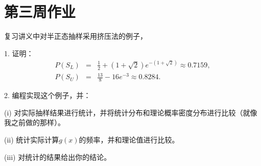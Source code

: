 \documentclass[a4paper]{ctexart}
\begin{document}
\section*{第三周作业}

复习讲义中对半正态抽样采用挤压法的例子，

1. 证明：
  \begin{eqnarray}
    P(S_L) &=& \frac{1}{2} + (1 + \sqrt{2})e^{-(1 + \sqrt{2})} \approx 0.7159,\\
    P(S_U) &=& \frac{13}{8} - 16e^{-3} \approx 0.8284.
  \end{eqnarray}

  2. 编程实现这个例子，并：

  (i) 对实际抽样结果进行统计，并将统计分布和理论概率密度分布进行比较（就像我之前做的那样）。

  (ii) 统计实际计算$g(x)$的频率，并和理论值进行比较。

  (iii) 对统计的结果给出你的结论。
\end{document}
